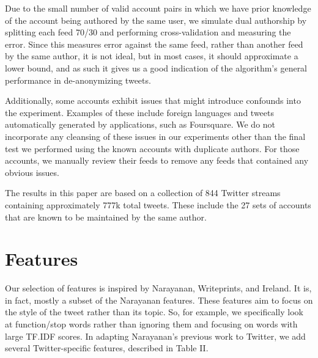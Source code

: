 \documentclass[10pt, conference, compsocconf]{IEEEtran}
\begin{document}
Due to the small number of valid account pairs in which we have prior
knowledge of the account being authored by the same user, we simulate
dual authorship by splitting each feed 70/30 and performing
cross-validation and measuring the error. Since this measures error
against the same feed, rather than another feed by the same author, it
is not ideal, but in most cases, it should approximate a lower bound,
and as such it gives us a good indication of the algorithm's general
performance in de-anonymizing tweets.

Additionally, some accounts exhibit issues that might introduce
confounds into the experiment. Examples of these include foreign
languages and tweets automatically generated by applications, such as
Foursquare. We do not incorporate any cleansing of these issues in our
experiments other than the final test we performed using the known
accounts with duplicate authors. For those accounts, we manually
review their feeds to remove any feeds that contained any obvious
issues.

The results in this paper are based on a collection of 844 Twitter
streams containing approximately 777k total tweets. These include the
27 sets of accounts that are known to be maintained by the same
author.

\section{Features}

Our selection of features is inspired by Narayanan\cite{Narayanan},
Writeprints\cite{Abbasi}, and Ireland\cite{Ireland}. It is, in fact,
mostly a subset of the Narayanan features. These features aim to focus
on the style of the tweet rather than its topic. So, for example, we
specifically look at function/stop words rather than ignoring them and
focusing on words with large TF.IDF scores. In adapting Narayanan's
previous work to Twitter, we add several Twitter-specific features,
described in Table II.
\end{document}

